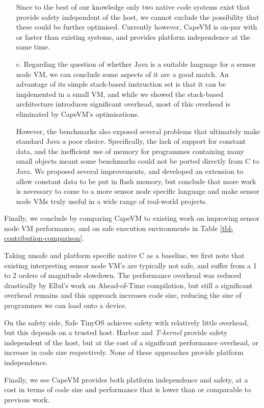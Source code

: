 \begin{enumerate}
	Since to the best of our knowledge only two native code systems exist that provide safety independent of the host, we cannot exclude the possibility that these could be further optimised. Currently however, CapeVM is on-par with or faster than existing systems, and provides platform independence at the same time.

	\item[c.]
	Regarding the question of whether Java is a suitable language for a sensor node VM, we can conclude some aspects of it are a good match. An advantage of its simple stack-based instruction set is that it can be implemented in a small VM, and while we showed the stack-based architecture introduces significant overhead, most of this overhead is eliminated by CapeVM's optimisations.
	
	However, the benchmarks also exposed several problems that ultimately make standard Java a poor choice. Specifically, the lack of support for constant data, and the inefficient use of memory for programmes containing many small objects meant some benchmarks could not be ported directly from C to Java. We proposed several improvements, and developed an extension to allow constant data to be put in flash memory, but conclude that more work is necessary to come to a more sensor node specific language and make sensor node VMs truly useful in a wide range of real-world projects.
\end{enumerate}



Finally, we conclude by comparing CapeVM to existing work on improving sensor node VM performance, and on safe execution environments in Table \ref{tbl-contribution-comparison}.

Taking unsafe and platform specific native C as a baseline, we first note that existing interpreting sensor node VM's are typically not safe, and suffer from a 1 to 2 orders of magnitude slowdown. The performance overhead was reduced drastically by Ellul's work on Ahead-of-Time compilation, but still a significant overhead remains and this approach increases code size, reducing the size of programmes we can load onto a device.

On the safety side, Safe TinyOS achieves safety with relatively little overhead, but this depends on a trusted host. Harbor and \emph{T-kernel} provide safety independent of the host, but at the cost of a significant performance overhead, or increase in code size respectively. None of these approaches provide platform independence.

Finally, we see CapeVM provides both platform independence and safety, at a cost in terms of code size and performance that is lower than or comparable to previous work.

